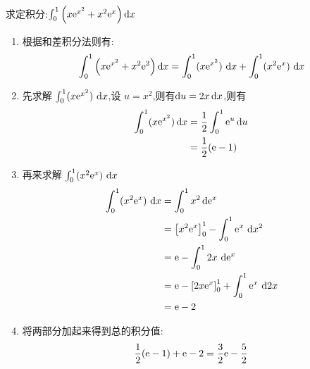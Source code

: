 \begin{questions}
	\question 求定积分:$\int_0^1\left(x\mathrm{e}^{x^2} + x^2\mathrm{e}^x\right)\mathop{}\!\mathrm{d}x$
	\begin{solution}
		\begin{enumerate}[label=\protect\circled{\arabic*}]
			\item 根据和差积分法则有:
			      \begin{equation*}
				      \int_0^1\left(x\mathrm{e}^{x^2} + x^2\mathrm{e}^2\right)\mathop{}\!\mathrm{d}x  = \int_0^1(x\mathrm{e}^{x^2})\,\mathop{}\!\mathrm{d}x + \int_0^1(x^2\mathrm{e}^x)\,\mathop{}\!\mathrm{d}x
			      \end{equation*}
			\item 先求解 $\int_0^1(x\mathrm{e}^{x^2})\,\mathop{}\!\mathrm{d}x $,设 $u=x^2$,则有$\mathop{}\!\mathrm{d}u=2x\mathop{}\!\mathrm{d}x$,则有
			      \begin{align*}
				      \int_0^1(x\mathrm{e}^{x^2})\mathop{}\!\mathrm{d}x & = \frac12\int_0^1\mathrm{e}^u\mathop{}\!\mathrm{d}u \\
				                                 & = \frac12(\mathrm{e}-1)
			      \end{align*}
			\item 再来求解 $\int_0^1(x^2\mathrm{e}^x)\,\mathop{}\!\mathrm{d}x$
			      \begin{align*}
				      \int_0^1(x^2\mathrm{e}^x)\,\mathop{}\!\mathrm{d}x & = \int_0^1 x^2\mathop{}\!\mathrm{d}\mathrm{e}^x                                    \\
				                                 & = \left[x^2\mathrm{e}^x\right]_0^1 - \int_0^1\mathrm{e}^x\,\mathop{}\!\mathrm{d}x^2       \\
				                                 & = \mathrm{e} - \int_0^12x\,\mathop{}\!\mathrm{d}\mathrm{e}^x                              \\
				                                 & = \mathrm{e} - \left[ 2x\mathrm{e}^x \right]_0^1 + \int_0^1\mathrm{e}^x\,\mathop{}\!\mathrm{d}2x \\
				                                 & = \mathrm{e}-2
			      \end{align*}
			\item 将两部分加起来得到总的积分值:
			      \begin{equation*}
				      \frac12(\mathrm{e}-1) + \mathrm{e} - 2 = \frac32\mathrm{e} - \frac52
			      \end{equation*}
		\end{enumerate}
	\end{solution}
\end{questions}
